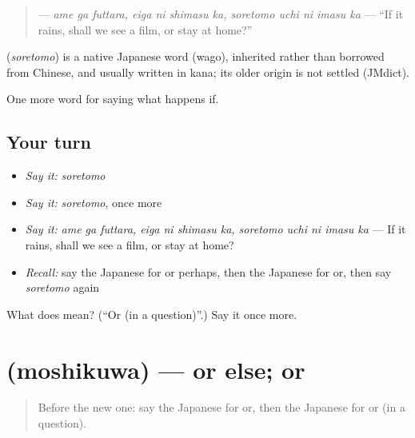 \begin{quote}
\textbf{    } — \emph{ame ga futtara, eiga ni shimasu ka, soretomo uchi ni imasu ka} — \textquotedblleft{}If it rains, shall we see a film, or stay at home?\textquotedblright{}
\end{quote}

\begin{cousinweb}
\textbf{} (\emph{soretomo}) is a native Japanese word (wago), inherited rather than borrowed from Chinese, and usually written in kana; its older origin is not settled (JMdict).
\end{cousinweb}

\begin{grammarlens}[title={What you've built}]
One more word for saying what happens if.
\end{grammarlens}

\subsection*{Your turn}
\begin{itemize}
\raggedright
  \item \emph{Say it:} \emph{soretomo}
  \item \emph{Say it:} \emph{soretomo}, once more
  \item \emph{Say it:} \emph{ame ga futtara, eiga ni shimasu ka, soretomo uchi ni imasu ka} — If it rains, shall we see a film, or stay at home?
  \item \emph{Recall:} say the Japanese for or perhaps, then the Japanese for or, then say \emph{soretomo} again
\end{itemize}

\begin{tcolorbox}[breakable,colback=teal!4,colframe=teal!35!black,title={Before you move on}]
What does  mean? (\textquotedblleft{}Or (in a question)\textquotedblright{}.) Say it once more.
\end{tcolorbox}
\section[\texorpdfstring{\ja{もしくは} (moshikuwa)}{もしくは (moshikuwa)}]{ (moshikuwa) — or else; or}

\label{lesson:JA-C528-moshikuwa}



\begin{quote}
Before the new one: say the Japanese for or, then the Japanese for or (in a question).
\end{quote}

